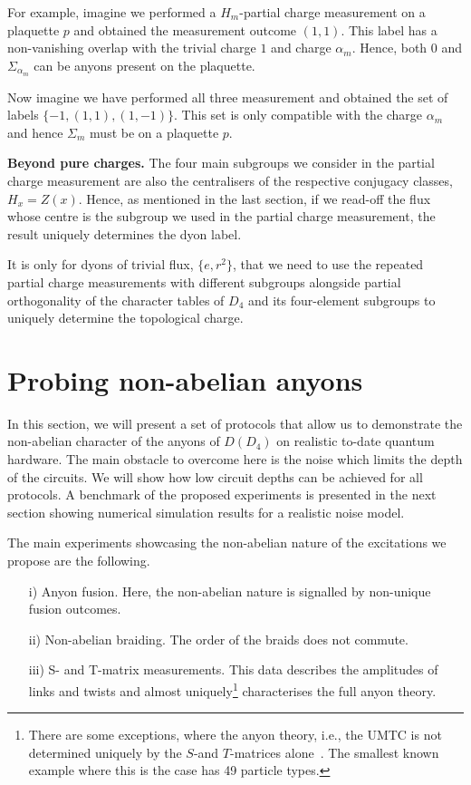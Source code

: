 \documentclass[a4paper,twocolumn,11pt, accepted=2024-06-14]{quantumarticle}
\begin{document}
For example, imagine we performed a $H_m$-partial charge measurement on a plaquette $p$ and obtained the measurement outcome $(1,1)$. This label has a non-vanishing overlap with the trivial charge $1$ and charge $\alpha_m$. Hence, both $0$ and $\Sigma_{\alpha_m}$ can be anyons present on the plaquette.

Now imagine we have performed all three measurement and obtained the set of labels $\{-1, (1, 1), (1, -1)\}$. This set is only compatible with the charge $\alpha_m$ and hence $\Sigma_m$ must be on a plaquette $p$.

\textbf{Beyond pure charges.} The four main subgroups we consider in the partial charge measurement are also the centralisers of the respective conjugacy classes, $H_x = Z(x)$. Hence, as mentioned in the last section, if we read-off the flux whose centre is the subgroup we used in the partial charge measurement, the result uniquely determines the dyon label.

It is only for dyons of trivial flux, $\{e, r^2\}$, that we need to use the repeated partial charge measurements with different subgroups alongside partial orthogonality of the character tables of $D_4$ and its four-element subgroups to uniquely determine the topological charge.

\section{Probing non-abelian anyons} \label{sec:probing}

In this section, we will present a set of protocols that allow us to demonstrate the non-abelian character of the anyons of $D(D_4)$ on realistic to-date quantum hardware. The main obstacle to overcome here is the noise which limits the depth of the circuits. We will show how low circuit depths can be achieved for all protocols. A benchmark of the proposed experiments is presented in the next section showing numerical simulation results for a realistic noise model.


The main experiments showcasing the non-abelian nature of the excitations we propose are the following.
\begin{itemize}

\item[i)] Anyon fusion. Here, the non-abelian nature is signalled by non-unique fusion outcomes.

\item[ii)] Non-abelian braiding. The order of the braids does not commute.

\item[iii)] S- and T-matrix measurements. This data describes the amplitudes of links and twists and almost uniquely\footnote{There are some exceptions, where the anyon theory, i.e., the UMTC is not determined uniquely by the $S$-and $T$-matrices alone~\cite{notdetermined2021}. The smallest known example where this is the case has 49 particle types.} characterises the full anyon theory.
\end{itemize}
\end{document}
